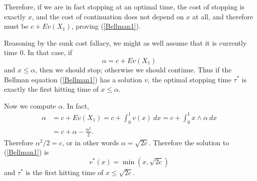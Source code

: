 \documentclass[10pt]{article}
\theoremstyle{definition}
\begin{document}
Therefore, if we are in fact stopping at an optimal time, the cost of stopping is exactly $x$, and the cost of continuation does not depend on $x$ at all, and therefore must be $c + Ev(X_1)$, proving (\ref{Bellman1}).

Reasoning by the sunk cost fallacy, we might as well assume that it is currently time $0$.
In that case, if
$$\alpha = c + Ev(X_1)$$
and $x \leq \alpha$, then we should stop; otherwise we should continue. Thus if the Bellman equation (\ref{Bellman1}) has a solution $v$, the optimal stopping time $\tau^*$ is exactly the first hitting time of $x \leq \alpha$.

Now we compute $\alpha$. In fact,
\begin{align*}
\alpha &= c + Ev(X_1) = c + \int_0^1 v(x) ~dx = c + \int_0^1 x \wedge \alpha ~dx\\
&= c + \alpha - \frac{\alpha^2}{2}.
\end{align*}
Therefore $\alpha^2/2 = c$, or in other words $\alpha = \sqrt{2c}$. Therefore the solution to (\ref{Bellman1}) is
\begin{equation}
\label{Cost1}
v^*(x) = \min(x, \sqrt{2c})
\end{equation}
and $\tau^*$ is the first hitting time of $x \leq \sqrt{2c}$.
\end{document}
